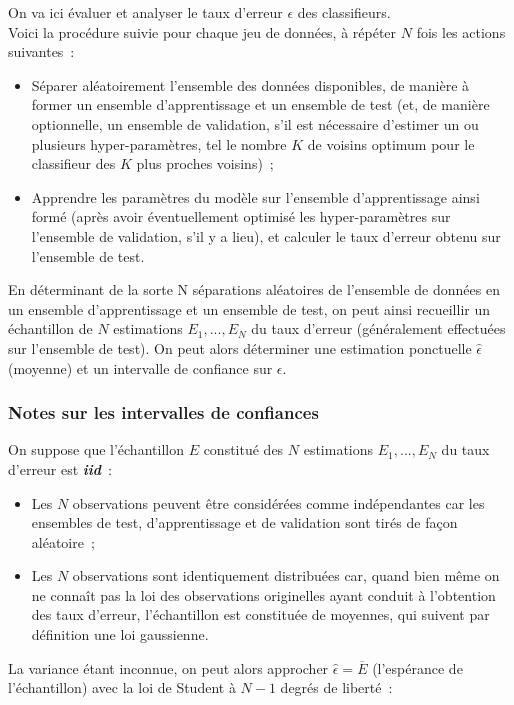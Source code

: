 \documentclass[a4paper,10pt]{report}
\begin{document}
On va ici évaluer et analyser le taux d'erreur $\epsilon$ des classifieurs.\\

Voici la procédure suivie pour chaque jeu de données, à répéter $N$ fois les actions suivantes~:
\begin{itemize}
	\item Séparer aléatoirement l’ensemble des données disponibles, de manière à former un ensemble d’apprentissage et un ensemble de test (et, de manière optionnelle, un ensemble de validation, s’il est nécessaire d’estimer un ou plusieurs hyper-paramètres, tel le nombre $K$ de voisins optimum pour le classifieur des $K$ plus proches voisins)~;
	\item Apprendre les paramètres du modèle sur l’ensemble d’apprentissage ainsi formé (après avoir éventuellement optimisé les hyper-paramètres sur l’ensemble de validation, s’il y a lieu), et calculer le taux d’erreur obtenu sur l’ensemble de test.
\end{itemize}

En déterminant de la sorte N séparations aléatoires de l’ensemble de données en un ensemble d’apprentissage et un ensemble de test, on peut ainsi recueillir un échantillon de $N$ estimations $E_{1},...,E_{N}$ du taux d’erreur (généralement effectuées sur l’ensemble de test). On peut alors déterminer une estimation ponctuelle $\hat{\epsilon} $ (moyenne) et un intervalle de confiance sur $\epsilon$.


\subsubsection{Notes sur les intervalles de confiances}
On suppose que l'échantillon $E$ constitué des $N$ estimations $E_{1},...,E_{N}$ du taux d’erreur est  \textit{\textbf{iid}}~:
\begin{itemize}
	\item Les $N$ observations peuvent être considérées comme indépendantes car les ensembles de test, d'apprentissage et de validation sont tirés de façon aléatoire~;
	\item Les $N$ observations sont identiquement distribuées car, quand bien même on ne connaît pas la loi des observations originelles ayant conduit à l'obtention des taux d'erreur, l'échantillon est constituée de moyennes, qui suivent par définition une loi gaussienne.
\end{itemize}

La variance étant inconnue, on peut alors approcher $\hat{\epsilon} = \overline{E}$ (l'espérance de l'échantillon) avec la loi de Student à $N-1$ degrés de liberté~:
\end{document}

